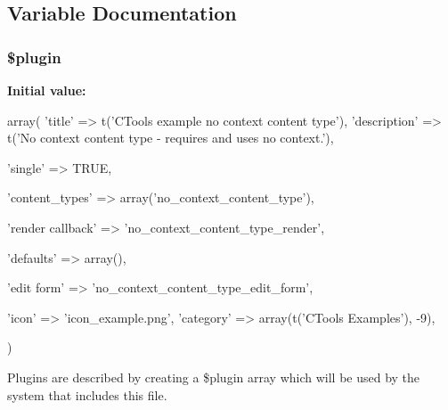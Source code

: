 \subsection{Variable Documentation}
\hypertarget{no__context__content__type_8inc_ada8a7130088351710bb02ed622d6bf65}{
\subsubsection[{\$plugin}]{\setlength{\rightskip}{0pt plus 5cm}\$plugin}}
\label{no__context__content__type_8inc_ada8a7130088351710bb02ed622d6bf65}
{\bfseries Initial value:}
\begin{DoxyCode}
 array(
  'title' => t('CTools example no context content type'),
  'description' => t('No context content type - requires and uses no context.'),

  
  'single' => TRUE,
  
  'content_types' => array('no_context_content_type'),
  
  'render callback' => 'no_context_content_type_render',
  
  'defaults' => array(),

  
  
  'edit form' => 'no_context_content_type_edit_form',

  
  'icon' => 'icon_example.png',
  'category' => array(t('CTools Examples'), -9),

  
  
)
\end{DoxyCode}
Plugins are described by creating a \$plugin array which will be used by the system that includes this file. 
